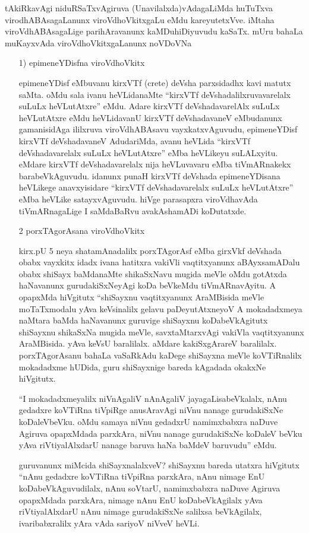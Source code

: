 tAkiRkavAgi niduRSaTxvAgiruva (Unavilalxda)vAdagaLiMda huTuTxva virodhA\break BAsagaLanunx viroVdhoVkitxgaLu eMdu kareyutetxVve. iMtaha viroVdhABAsagaLige pari\-hAravanunx kaMDuhiDiyuvudu kaSaTx. mUru bahaLa muKayxvAda viroVdhoVkitxgaLanunx noVDoVNa
\begin{itemize}
\item[{\rm 1)}] epimeneYDisfna viroVdhoVkitx

epimeneYDisf eMbuvanu kirxVTf {\rm (crete)} deVsha parxsidadhx kavi matutx saMta. oMdu sala ivanu heVLidanaMte ``kirxVTf deVshadalilxruvavarelalx suLuLx heVLutAtxre'' eMdu. Adare kirxVTf deVshadavarelAlx suLuLx heVLutAtxre eMdu heVLidavanU kirxVTf deVsha\-davaneV eMbudanunx gamanisidAga ililxruva viroVdhABAsavu vayxkatxvAguvudu, epimeneYDisf kirxVTf deVshadavaneV AdudariMda, avanu heVLida ``kirxVTf deVshadavarelalx suLuLx heVLutAtxre'' eMba heVLikeyu suLALxyitu. eMdare kirxVTf deVshadavarelalx nija heVLuvavaru eMba tiVmARnakekx barabeVkAguvudu. idanunx punaH kirxVTf deVshada epimeneYDisana heVLikege anavxyisidare ``kirxVTf deVshadavarelalx suLuLx heVLutAtxre'' eMba heVLike satayxvAguvudu. hiVge parasapxra viroVdhavAda tiVmARnagaLige I saMdaBaRvu avakAshamADi koDutatxde.
\item[{\rm 2}] porxTAgorAsana viroVdhoVkitx

kirx.pU {\rm 5} neya shatamAnadalilx porxTAgorAsf eMba girxVkf deVshada obabx vayxkitx idadx ivana hatitxra vakiVli vaqtitxyanunx aBAyxsamADalu obabx shiSayx baMdanaMte shikaSxNavu mugida meVle oMdu gotAtxda haNavanunx gurudakiSxNeyAgi koDa beVkeMdu tiVmARnavAyitu. A opapxMda hiVgitutx ``shiSayxnu vaqtitxyanunx AraMBisida meVle moTaTxmodalu yAva keVsinalilx gelavu paDeyutAtxneyoV A mokadadxmeya naMtara baMda haNavanunx guruvige shiSayxnu koDabeVkAgitutx shiSayxnu shikaSxNa mugida meVle, savxtaMtarxvAgi vakiVla vaqtitxyanunx AraMBisida. yAva keVsU baralilalx. aMdare kakiSxgArareV baralilalx. porxTAgorAsanu bahaLa vaSaRkAdu kaDege shiSayxna meVle koVTiRnalilx mokadadxme hUDida, guru shiSayxnige bareda kAgadada okakxNe hiVgitutx.

``I mokadadxmeyalilx niVnAgaliV nAnAgaliV jayagaLisabeVkalalx, nAnu gedadxre koVTiRna tiVpiRge anusAravAgi niVnu nanage gurudakiSxNe koDaleVbeVku. oMdu samaya niVnu gedadxrU namimxbabxra naDuve Agiruva opapxMdada parxkAra, niVnu nanage gurudakiSxNe koDaleV beVku yAva riVtiyalAlxdarU nanage baruva haNa baMdeV baruvudu'' eMdu.

guruvanunx miMcida shiSayxnalalxveV? shiSayxnu bareda utatxra hiVgitutx ``nAnu gedadxre koVTiRna tiVpiRna parxkAra, nAnu nimage EnU koDabeVkAguvudilalx, nAnu soVtarU, namimxbabxra naDuve Agiruva opapxMdada parxkAra, nimage nAnu EnU koDabeVkAgilalx yAva riVtiyalAlxdarU nAnu nimage gurudakiSxNe salilxsa beVkAgilalx, ivaribabxralilx yAra vAda sariyoV niVveV heVLi.


\end{itemize}
